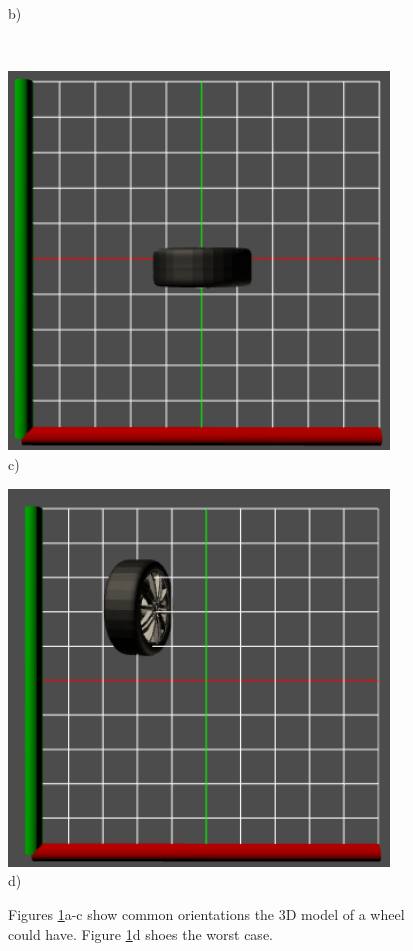 \begin{figure}
\begin{minipage}{.5\textwidth}
    b)
  \end{minipage}\\
  \begin{minipage}{.5\textwidth}
    \centering
  	\includegraphics[width=0.9\textwidth]{../assets/wheel3.png}\\
    c)
  \end{minipage}
  \begin{minipage}{.5\textwidth}
    \centering
  	\includegraphics[width=0.9\textwidth]{../assets/wheel4.png}\\
    d)
  \end{minipage}
  \caption{Figures \ref{fig:wheel}a-c show common orientations the \gls{3D} model of a wheel could have. Figure \ref{fig:wheel}d shoes the worst case.}
	\label{fig:wheel}
\end{figure}

